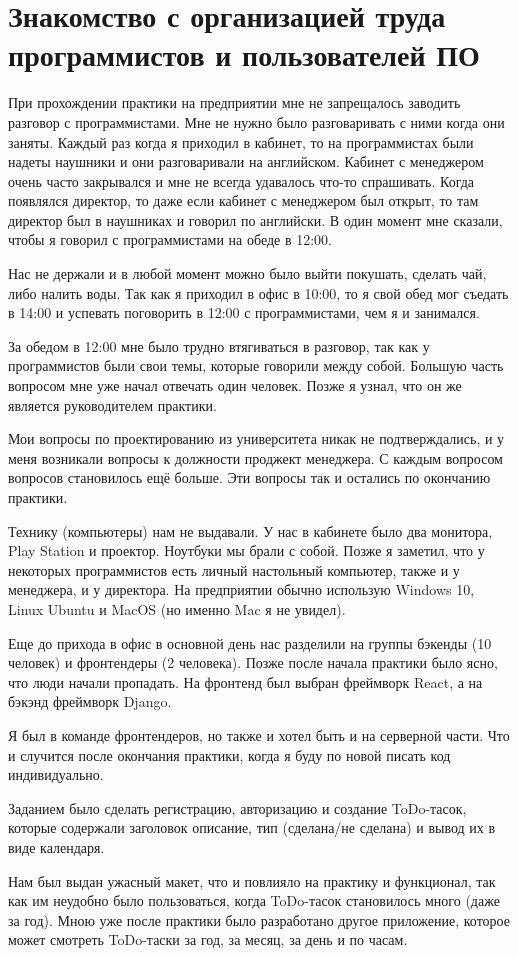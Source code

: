 \newpage
\section{Знакомство с организацией труда программистов и пользователей ПО}

При прохождении практики на предприятии мне не запрещалось заводить разговор с программистами.
Мне не нужно было разговаривать с ними когда они заняты. Каждый раз когда я приходил в кабинет,
то на программистах были надеты наушники и они разговаривали на английском.
Кабинет с менеджером очень часто закрывался и мне не всегда удавалось что-то спрашивать.
Когда появлялся директор, то даже если кабинет с менеджером был открыт,
то там директор был в наушниках и говорил по английски.
В один момент мне сказали, чтобы я говорил с программистами на обеде в 12:00.

Нас не держали и в любой момент можно было выйти покушать, сделать чай, либо налить воды.
Так как я приходил в офис в 10:00, то я свой обед мог съедать в 14:00 и успевать поговорить в 12:00 с программистами,
чем я и занимался.

За обедом в 12:00 мне было трудно втягиваться в разговор, так как у программистов были свои темы,
которые говорили между собой. Большую часть вопросом мне уже начал отвечать один человек.
Позже я узнал, что он же является руководителем практики.

Мои вопросы по проектированию из университета никак не подтверждались,
и у меня возникали вопросы к должности проджект менеджера.
С каждым вопросом вопросов становилось ещё больше.
Эти вопросы так и остались по окончанию практики.

Технику (компьютеры) нам не выдавали. У нас в кабинете было два монитора, Play Station и проектор.
Ноутбуки мы брали с собой.
Позже я заметил, что у некоторых программистов есть личный настольный компьютер, также и у менеджера, и у директора.
На предприятии обычно использую Windows 10, Linux Ubuntu и MacOS (но именно Mac я не увидел).

Еще до прихода в офис в основной день нас разделили на группы бэкенды (10 человек) и фронтендеры (2 человека).
Позже после начала практики было ясно, что люди начали пропадать.
На фронтенд был выбран фреймворк React, а на бэкэнд фреймворк Django.

Я был в команде фронтендеров, но также и хотел быть и на серверной части.
Что и случится после окончания практики, когда я буду по новой писать код индивидуально.

Заданием было сделать регистрацию, авторизацию и создание ToDo-тасок, которые содержали заголовок описание,
тип (сделана/не сделана) и вывод их в виде календаря.

Нам был выдан ужасный макет, что и повлияло на практику и функционал, так как им неудобно было пользоваться,
когда ToDo-тасок становилось много (даже за год).
Мною уже после практики было разработано другое приложение,
которое может смотреть ToDo-таски за год, за месяц, за день и по часам.
